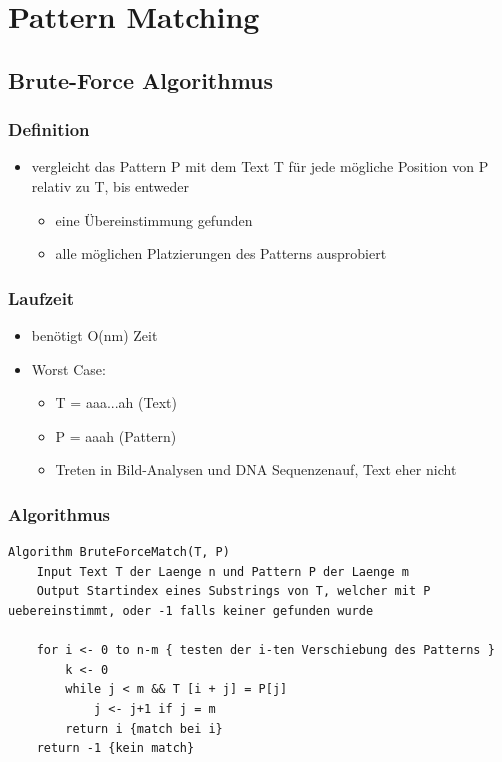 \section{Pattern Matching}

\subsection{Brute-Force Algorithmus}
\subsubsection{Definition}
\begin{itemize}
    \item vergleicht das Pattern P mit dem Text T für jede mögliche Position von P relativ zu T, bis entweder
    \begin{itemize}
        \item eine Übereinstimmung gefunden
        \item alle möglichen Platzierungen des Patterns ausprobiert
    \end{itemize}
\end{itemize}
\subsubsection{Laufzeit}
\begin{itemize}
    \item benötigt O(nm) Zeit
    \item Worst Case:
    \begin{itemize}
        \item T = aaa...ah (Text)
        \item P = aaah (Pattern)
        \item Treten  in  Bild-Analysen  und  DNA  Sequenzenauf, Text eher nicht
    \end{itemize}
\end{itemize}
\subsubsection{Algorithmus}
\begin{lstlisting}
Algorithm BruteForceMatch(T, P)
    Input Text T der Laenge n und Pattern P der Laenge m
    Output Startindex eines Substrings von T, welcher mit P uebereinstimmt, oder -1 falls keiner gefunden wurde

    for i <- 0 to n-m { testen der i-ten Verschiebung des Patterns }
        k <- 0
        while j < m && T [i + j] = P[j]
            j <- j+1 if j = m
        return i {match bei i}
    return -1 {kein match}
\end{lstlisting}


